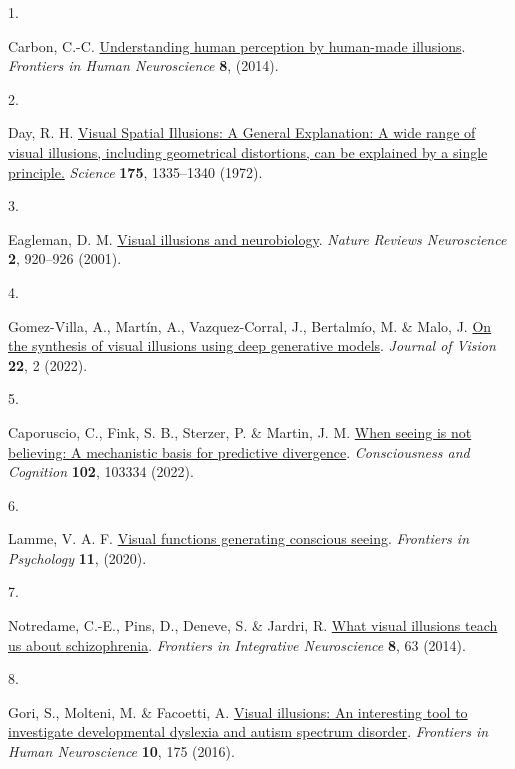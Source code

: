 \documentclass[
  man,floatsintext]{apa6}
\newlength{\cslhangindent}
\newlength{\csllabelwidth}
\newlength{\cslentryspacingunit} %
\newenvironment{CSLReferences}[2] %
 {%
  \setlength{\parindent}{0pt}
  \ifodd #1
  \let\oldpar\par
  \def\par{\hangindent=\cslhangindent\oldpar}
  \fi
  \setlength{\parskip}{#2\cslentryspacingunit}
 }%
 {}
\newcommand{\CSLLeftMargin}[1]{\parbox[t]{\csllabelwidth}{#1}}
\newcommand{\CSLRightInline}[1]{\parbox[t]{\linewidth - \csllabelwidth}{#1}\break}
\begin{document}
\hypertarget{refs}{}
\begin{CSLReferences}{0}{0}
\leavevmode{}%
\CSLLeftMargin{1. }%
\CSLRightInline{Carbon, C.-C. \href{https://www.frontiersin.org/articles/10.3389/fnhum.2014.00566}{Understanding human perception by human-made illusions}. \emph{Frontiers in Human Neuroscience} \textbf{8}, (2014).}

\leavevmode{}%
\CSLLeftMargin{2. }%
\CSLRightInline{Day, R. H. \href{https://doi.org/10.1126/science.175.4028.1335}{Visual Spatial Illusions: A General Explanation: A wide range of visual illusions, including geometrical distortions, can be explained by a single principle.} \emph{Science} \textbf{175}, 1335--1340 (1972).}

\leavevmode{}%
\CSLLeftMargin{3. }%
\CSLRightInline{Eagleman, D. M. \href{https://doi.org/10.1038/35104092}{Visual illusions and neurobiology}. \emph{Nature Reviews Neuroscience} \textbf{2}, 920--926 (2001).}

\leavevmode{}%
\CSLLeftMargin{4. }%
\CSLRightInline{Gomez-Villa, A., Martín, A., Vazquez-Corral, J., Bertalmío, M. \& Malo, J. \href{https://doi.org/10.1167/jov.22.8.2}{On the synthesis of visual illusions using deep generative models}. \emph{Journal of Vision} \textbf{22}, 2 (2022).}

\leavevmode{}%
\CSLLeftMargin{5. }%
\CSLRightInline{Caporuscio, C., Fink, S. B., Sterzer, P. \& Martin, J. M. \href{https://doi.org/10.1016/j.concog.2022.103334}{When seeing is not believing: A mechanistic basis for predictive divergence}. \emph{Consciousness and Cognition} \textbf{102}, 103334 (2022).}

\leavevmode{}%
\CSLLeftMargin{6. }%
\CSLRightInline{Lamme, V. A. F. \href{https://www.frontiersin.org/articles/10.3389/fpsyg.2020.00083}{Visual functions generating conscious seeing}. \emph{Frontiers in Psychology} \textbf{11}, (2020).}

\leavevmode{}%
\CSLLeftMargin{7. }%
\CSLRightInline{Notredame, C.-E., Pins, D., Deneve, S. \& Jardri, R. \href{https://doi.org/10.3389/fnint.2014.00063}{What visual illusions teach us about schizophrenia}. \emph{Frontiers in Integrative Neuroscience} \textbf{8}, 63 (2014).}

\leavevmode{}%
\CSLLeftMargin{8. }%
\CSLRightInline{Gori, S., Molteni, M. \& Facoetti, A. \href{https://doi.org/10.3389/fnhum.2016.00175}{Visual illusions: An interesting tool to investigate developmental dyslexia and autism spectrum disorder}. \emph{Frontiers in Human Neuroscience} \textbf{10}, 175 (2016).}


\end{CSLReferences}
\end{document}
